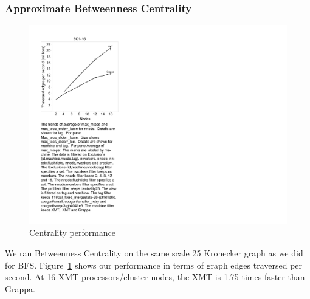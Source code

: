 \subsubsection{Approximate Betweenness Centrality}
\begin{figure}[tH]
\begin{center}
  \includegraphics[width=0.95\columnwidth]{figs/centrality_performance}
\begin{minipage}{0.95\columnwidth}
  \caption{\label{fig:centrality-performance} Centrality performance}
\end{minipage}
\vspace{-3ex}
\end{center}
\end{figure}

We ran Betweenness Centrality on the same scale 25 Kronecker graph as
we did for BFS. Figure~\ref{fig:centrality-performance} shows our
performance in terms of graph edges traversed per second. At 16 XMT
processors/cluster nodes, the XMT is 1.75 times faster than Grappa.

